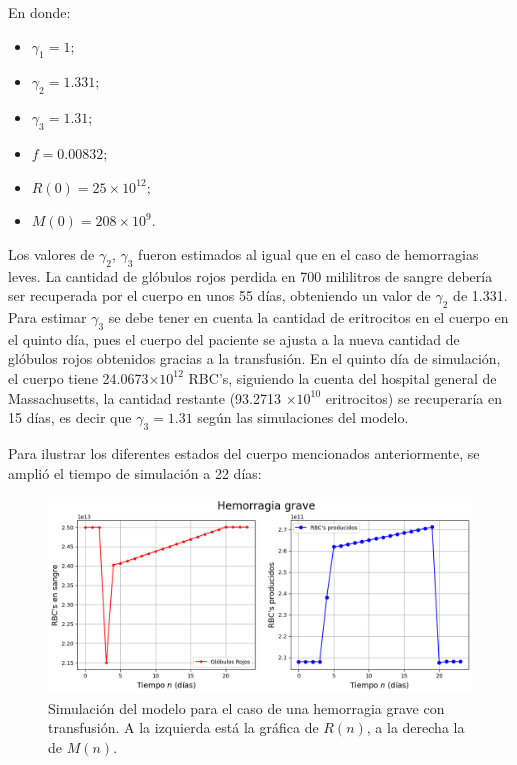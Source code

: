 En donde:
\begin{itemize}
    \item $\gamma_1=1$;
    \item $\gamma_2=1.331$;
    \item $\gamma_3=1.31$;
    \item $f=0.00832$;
    \item $R(0) = 25\times 10^{12};$
    \item $M(0) = 208 \times 10^{9}.$
\end{itemize}
Los valores de $\gamma_2$, $\gamma_3$ fueron estimados al igual que en el caso de hemorragias leves. La cantidad de glóbulos rojos perdida en 700 mililitros de sangre debería ser recuperada por el cuerpo en unos 55 días, obteniendo un valor de $\gamma_2$ de 1.331. Para estimar $\gamma_3$ se debe tener en cuenta la cantidad de eritrocitos en el cuerpo en el quinto día, pues el cuerpo del paciente se ajusta a la nueva cantidad de glóbulos rojos obtenidos gracias a la transfusión. En el quinto día de simulación, el cuerpo tiene 24.0673$\times 10^{12}$ RBC's, siguiendo la cuenta del hospital general de Massachusetts, la cantidad restante (93.2713 $\times 10^{10}$ eritrocitos) se recuperaría en 15 días, es decir que $\gamma_3 = 1.31$ según las simulaciones del modelo.

Para ilustrar los diferentes estados del cuerpo mencionados anteriormente, se amplió el tiempo de simulación a 22 días: 

\begin{figure}[H]
    \centering
    \captionsetup{justification=centering}
    \includegraphics[scale=0.534]{figures/HemoGrave.png}
    \caption{Simulación del modelo para el caso de una hemorragia grave con transfusión. A la izquierda está la gráfica de $R(n)$, a la derecha la de $M(n)$.}
    \label{sec:variaciones:fig:HemoGrave}
\end{figure}

